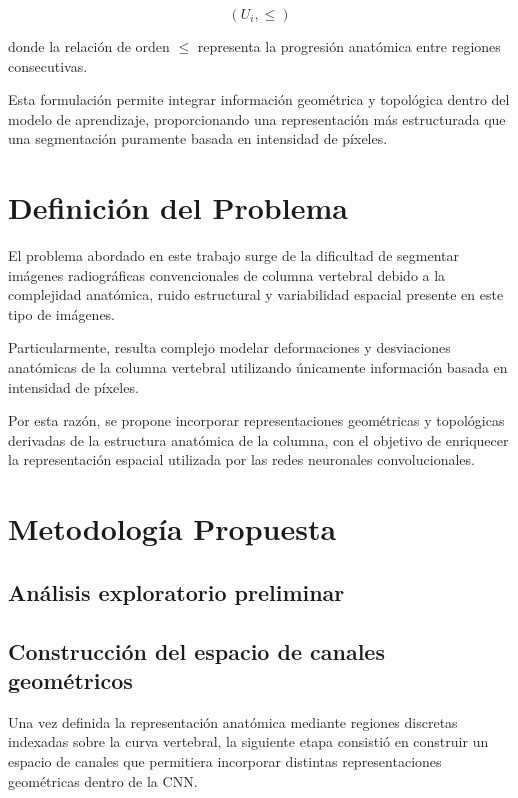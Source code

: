 \documentclass[conference]{IEEEtran}
\begin{document}
\[
(U_i, \leq)
\]

donde la relación de orden $\leq$ representa la progresión anatómica entre regiones consecutivas.

Esta formulación permite integrar información geométrica y topológica dentro del modelo de aprendizaje, proporcionando una representación más estructurada que una segmentación puramente basada en intensidad de píxeles.


\section{Definición del Problema}

El problema abordado en este trabajo surge de la dificultad de segmentar imágenes radiográficas convencionales de columna vertebral debido a la complejidad anatómica, ruido estructural y variabilidad espacial presente en este tipo de imágenes.

Particularmente, resulta complejo modelar deformaciones y desviaciones anatómicas de la columna vertebral utilizando únicamente información basada en intensidad de píxeles.

Por esta razón, se propone incorporar representaciones geométricas y topológicas derivadas de la estructura anatómica de la columna, con el objetivo de enriquecer la representación espacial utilizada por las redes neuronales convolucionales.

\section{Metodología Propuesta}

\subsection{Análisis exploratorio preliminar}






\subsection{Construcción del espacio de canales geométricos}

Una vez definida la representación anatómica mediante regiones discretas indexadas sobre la curva vertebral, la siguiente etapa consistió en construir un espacio de canales que permitiera incorporar distintas representaciones geométricas dentro de la CNN.
\end{document}
